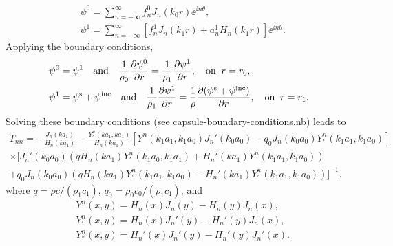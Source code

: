 \documentclass[ 12pt, a4paper]{article}
\begin{document}
\begin{align}
  & \psi^0 = \sum_{n=-\infty}^\infty f_n^0 J_{n}(k_0 r) \ee^{\ii n \theta},
  \\
  & \psi^1 = \sum_{n=-\infty}^\infty \left [ f_n^1 J_{n}(k_1 r) + a_n^1 H_{n}(k_1 r) \right ] \ee^{\ii n \theta}.
\end{align}
Applying the boundary conditions,
\begin{align}
  	& \psi^0 = \psi^1 \quad \text{and} \quad \frac{1}{\rho_0} \frac{\partial \psi^0}{\partial r} = \frac{1}{\rho_1} \frac{\partial \psi^1}{\partial r}, \quad \text{on} \;\; r = r_0,
    \label{eqn:inner_bc}
    \\
  	& \psi^1 = \psi^{\mathrm{s}} + \psi^{\mathrm{inc}} \quad \text{and} \quad \frac{1}{\rho_1} \frac{\partial \psi^1}{\partial r} = \frac{1}{\rho} \frac{\partial (\psi^{\mathrm{s}} + \psi^{\mathrm{inc}})}{\partial r}, \quad \text{on} \;\; r = r_1.
    \label{eqn:outer_bc}
\end{align}
Solving these boundary conditions (see \href{capsule-boundary-conditions.nb}{capsule-boundary-conditions.nb}) leads to
\begin{multline}
  T_{nn} = - \frac{J_n(k a_1)}{H_n(k a_1)} - \frac{Y^n_{'}(k a_1, k a_1)}{H_n(ka_1)} \left[Y^n(k_1 a_1,k_1 a_0) J_n'(k_0 a_0) - q_0 J_n(k_0 a_0) Y^n_{'}(k_1 a_1,k_1 a_0) \right]
  \\ \times \big[
    J_n'(k_0 a_0)(q H_n(k a_1)Y^n_{'}(k_1 a_0,k_1 a_1) + H_n'(k a_1) Y^n(k_1 a_1,k_1 a_0))
    \\
    + q_0 J_n(k_0 a_0)(q H_n(k a_1)Y^n_{''}(k_1 a_1,k_1 a_0) - H_n'(k a_1) Y^n_{'}(k_1 a_1, k_1 a_0))
  \big]^{-1}.
\end{multline}
where $q = \rho c/(\rho_1 c_1)$, $q_0 = \rho_0 c_0/( \rho_1 c_1)$, and
\begin{align}
  & Y^n(x,y) = H_n(x) J_n(y) - H_n(y) J_n(x), \\
  & Y^n_{'}(x,y) = H_n(x) J_n'(y) - H_n'(y) J_n(x), \\
  & Y^n_{''}(x,y) = H_n'(x) J_n'(y) - H_n'(y) J_n'(x).
\end{align}

%
\end{document}

